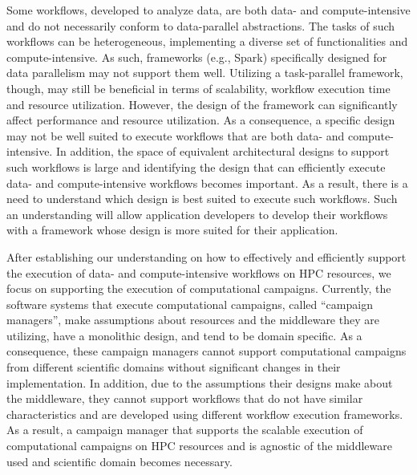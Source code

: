 Some workflows, developed to analyze data, are both data- and compute-intensive
and do not necessarily conform to data-parallel abstractions. The tasks of such
workflows can be heterogeneous, implementing a diverse set of functionalities
and compute-intensive. As such, frameworks (e.g., Spark) specifically designed
for data parallelism may not support them well. Utilizing a task-parallel
framework, though, may still be beneficial in terms of scalability, workflow
execution time and resource utilization. However, the design of the framework
can significantly affect performance and resource utilization. As a
consequence, a specific design may not be well suited to execute workflows that
are both data- and compute-intensive. In addition, the space of equivalent
architectural designs to support such workflows is large and identifying the
design that can efficiently execute data- and compute-intensive workflows
becomes important. As a result, there is a need to understand which design is
best suited to execute such workflows. Such an understanding will allow
application developers to develop their workflows with a framework whose design
is more suited for their application.

After establishing our understanding on how to effectively and efficiently
support the execution of data- and compute-intensive workflows on HPC resources,
we focus on supporting the execution of computational campaigns. Currently, the
software systems that execute computational campaigns, called ``campaign
managers'', make assumptions about resources and the middleware they are
utilizing, have a monolithic design, and tend to be domain specific. As a
consequence, these campaign managers cannot support computational campaigns from
different scientific domains without significant changes in their
implementation. In addition, due to the assumptions their designs make about the
middleware, they cannot support workflows that do not have similar
characteristics and are developed using different workflow execution frameworks.
As a result, a campaign manager that supports the scalable execution of
computational campaigns on HPC resources and is agnostic of the middleware used
and scientific domain becomes necessary.


